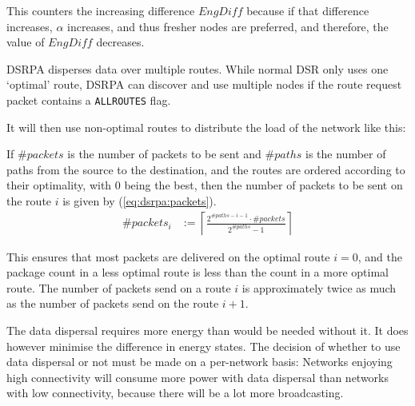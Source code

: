 This counters the increasing difference $EngDiff$ because if that
difference increases, $\alpha$ increases, and thus fresher nodes are preferred,
and therefore, the value of $EngDiff$ decreases.

DSRPA disperses data over multiple routes.  While normal DSR only uses one
`optimal' route, DSRPA can discover and use multiple nodes if the route request
packet contains a \texttt{ALLROUTES} flag.

It will then use non-optimal routes to distribute the load of the network like
this:

If $\#packets$ is the number of packets to be sent and
$\#paths$ is the number of paths from the source to the
destination, and the routes are ordered according to their optimality,
with 0 being the best, then the number of packets to be sent on the route $i$
is given by (\ref{eq:dsrpa:packets}).
\begin{align}
     \#packets_{i} &:= \left\lceil \frac{2^{\# paths - i - 1} \cdot \# packets}{2^{\#paths} - 1} \right\rceil
     \label{eq:dsrpa:packets}
\end{align}

This ensures that most packets are delivered on the optimal route $i=0$, and
the package count in a less optimal route is less than the count in a more
optimal route. The number of packets send on a route $i$ is approximately
twice as much as the number of packets send on the route $i+1$.

The data dispersal requires more energy than would be needed without it. It
does however minimise the difference in energy states. The decision of whether
to use data dispersal or not must be made on a per-network basis: Networks
enjoying high connectivity will consume more power with data dispersal than
networks with low connectivity, because there will be a lot more broadcasting.
